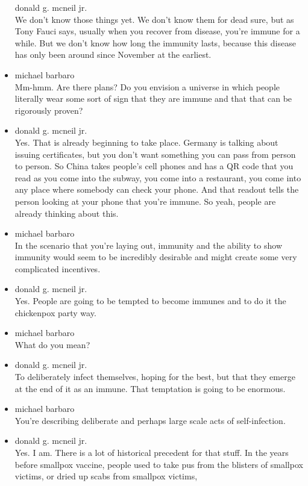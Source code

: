 \begin{itemize}
  donald g. mcneil jr.\\
  We don't know those things yet. We don't know them for dead sure, but
  as Tony Fauci says, usually when you recover from disease, you're
  immune for a while. But we don't know how long the immunity lasts,
  because this disease has only been around since November at the
  earliest.
\item
  michael barbaro\\
  Mm-hmm. Are there plans? Do you envision a universe in which people
  literally wear some sort of sign that they are immune and that that
  can be rigorously proven?
\item
  donald g. mcneil jr.\\
  Yes. That is already beginning to take place. Germany is talking about
  issuing certificates, but you don't want something you can pass from
  person to person. So China takes people's cell phones and has a QR
  code that you read as you come into the subway, you come into a
  restaurant, you come into any place where somebody can check your
  phone. And that readout tells the person looking at your phone that
  you're immune. So yeah, people are already thinking about this.
\item
  michael barbaro\\
  In the scenario that you're laying out, immunity and the ability to
  show immunity would seem to be incredibly desirable and might create
  some very complicated incentives.
\item
  donald g. mcneil jr.\\
  Yes. People are going to be tempted to become immunes and to do it the
  chickenpox party way.
\item
  michael barbaro\\
  What do you mean?
\item
  donald g. mcneil jr.\\
  To deliberately infect themselves, hoping for the best, but that they
  emerge at the end of it as an immune. That temptation is going to be
  enormous.
\item
  michael barbaro\\
  You're describing deliberate and perhaps large scale acts of
  self-infection.
\item
  donald g. mcneil jr.\\
  Yes. I am. There is a lot of historical precedent for that stuff. In
  the years before smallpox vaccine, people used to take pus from the
  blisters of smallpox victims, or dried up scabs from smallpox victims,

\end{itemize}
